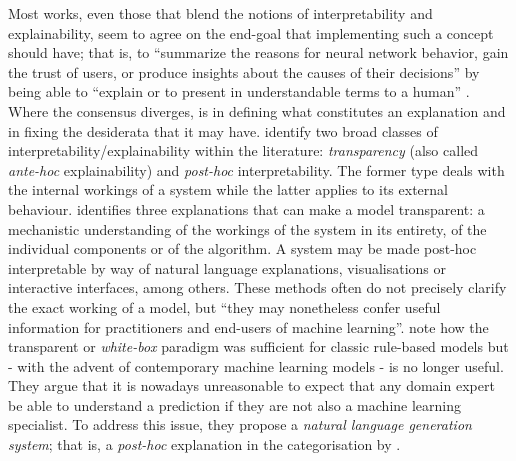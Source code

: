 Most works, even those that blend the notions of interpretability and explainability, seem to agree on the end-goal that implementing such a concept should have; that is, to \enquote{summarize the reasons for neural network behavior, gain the trust of users, or produce insights about the causes of their decisions} \citep{gilpin2018explaining} by being able to \enquote{explain or to present in understandable terms to a human} \citep{doshi2017towards}.
Where the consensus diverges, is in defining what constitutes an explanation and in fixing the desiderata that it may have.
\citet{mittelstadt2019explaining} identify two broad classes of interpretability/explainability within the literature: \textit{transparency} (also called \textit{ante-hoc} explainability) and \textit{post-hoc} interpretability.
The former type deals with the internal workings of a system while the latter applies to its external behaviour.
\citet{Lipton2016} identifies three explanations that can make a model transparent: a mechanistic understanding of the workings of the system in its entirety, of the individual components or of the algorithm.
A system may be made post-hoc interpretable by way of natural language explanations, visualisations or interactive interfaces, among others.
These methods often do not precisely clarify the exact working of a model, but \enquote{they may nonetheless confer useful information for practitioners and end-users of machine learning}.
\citet{Biran2017} note how the transparent or \textit{white-box} paradigm was sufficient for classic rule-based models but - with the advent of contemporary machine learning models - is no longer useful.
They argue that it is nowadays unreasonable to expect that any domain expert be able to understand a prediction if they are not also a machine learning specialist.
To address this issue, they propose a \textit{natural language generation system}; that is, a \textit{post-hoc} explanation in the categorisation by \citet{mittelstadt2019explaining}.

